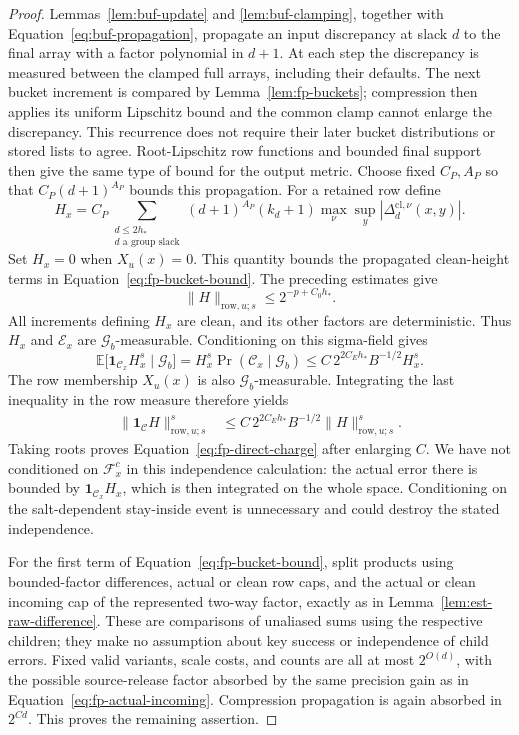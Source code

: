 \begin{proof}
Lemmas~\ref{lem:buf-update} and \ref{lem:buf-clamping}, together with
Equation~\eqref{eq:buf-propagation}, propagate an input discrepancy at
slack $d$ to the final array with a factor polynomial in $d+1$.
At each step the discrepancy is measured between the clamped full
arrays, including their defaults.  The next bucket increment is
compared by Lemma~\ref{lem:fp-buckets}; compression then applies its
uniform Lipschitz bound and the common clamp cannot enlarge the
discrepancy.  This recurrence does not require their later bucket
distributions or stored lists to agree.
Root-Lipschitz row functions and bounded final support then give the
same type of bound for the output metric.  Choose fixed $C_P,A_P$ so
that $C_P(d+1)^{A_P}$ bounds this propagation.  For a retained row define
\[
 H_x=C_P\sum_{\substack{d\le2h_*\\d\text{ a group slack}}}
       (d+1)^{A_P}(k_d+1)
       \max_\nu\sup_y|\Delta_d^{\mathrm{cl},\nu}(x,y)|.
\]
Set $H_x=0$ when $X_u(x)=0$.  This quantity bounds the propagated clean-height terms in
Equation~\eqref{eq:fp-bucket-bound}.  The preceding estimates give
\[
                 \|H\|_{\mathrm{row},u;s}\le2^{-p+C_0h_*}.
\]
All increments defining $H_x$ are clean, and its other factors are
deterministic.  Thus $H_x$ and $\mathcal E_x$ are
$\mathcal G_b$-measurable.  Conditioning on this sigma-field gives
\[
 \mathbb E\bigl[\mathbf1_{\mathcal C_x}H_x^s\mid\mathcal G_b\bigr]
 =H_x^s\Pr(\mathcal C_x\mid\mathcal G_b)
 \le C\,2^{2C_Eh_*}B^{-1/2}H_x^s.
\]
The row membership $X_u(x)$ is also $\mathcal G_b$-measurable.
Integrating the last inequality in the row measure therefore yields
\begin{align*}
 \|\mathbf1_{\mathcal C}H\|_{\mathrm{row},u;s}^s
 &\le C\,2^{2C_Eh_*}B^{-1/2}
              \|H\|_{\mathrm{row},u;s}^s.
\end{align*}
Taking roots proves Equation~\eqref{eq:fp-direct-charge} after enlarging
$C$.  We have not conditioned on $\mathcal F_x^c$ in this independence
calculation: the actual error there is bounded by
$\mathbf1_{\mathcal C_x}H_x$, which is then integrated on the whole
space.  Conditioning on the salt-dependent stay-inside event is
unnecessary and could destroy the stated independence.

For the first term of Equation~\eqref{eq:fp-bucket-bound}, split products
using bounded-factor differences, actual or clean row caps, and the
actual or clean incoming cap of the represented two-way factor, exactly
as in Lemma~\ref{lem:est-raw-difference}.  These are comparisons of
unaliased sums using the respective children; they make no assumption
about key success or independence of child errors.  Fixed valid
variants, scale costs, and counts are all at most $2^{O(d)}$, with the
possible source-release factor absorbed by the same precision gain as
in Equation~\eqref{eq:fp-actual-incoming}.  Compression propagation is
again absorbed in $2^{C d}$.  This proves the remaining assertion.
\end{proof}

